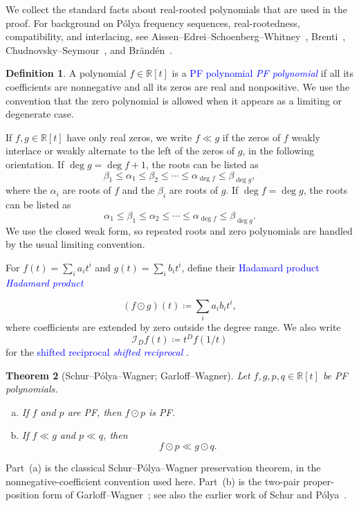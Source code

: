 \documentclass[reqno]{amsart}
\numberwithin{equation}{section}
\newtheorem{theorem}{Theorem}[section]
\theoremstyle{definition}
\newtheorem{definition}[theorem]{Definition}
\newcommand{\defin}[1]{%
\relax\ifmmode%
\textcolor{blue}{#1}%
\else\textcolor{blue}{\emph{#1}}%
\fi%
}
\newcommand{\setR}{\mathbb{R}}
\newcommand{\poly}{\setR[t]}
\newcommand{\had}{\odot}
\newcommand{\opI}{\mathcal{I}}
\begin{document}
We collect the standard facts about real-rooted polynomials that are used in
the proof.  For background on P{\'o}lya frequency sequences, real-rootedness,
compatibility, and interlacing, see
Aissen--Edrei--Schoenberg--Whitney~\cite{AissenEdreiSchoenbergWhitney1951},
Brenti~\cite{Brenti1989}, Chudnovsky--Seymour~\cite{ChudnovskySeymour2007},
and Br{\"a}nd{\'e}n~\cite{Branden2015}.

\begin{definition}
\label{def:pf}
A polynomial $f\in\poly$ is a \defin{PF polynomial} if all its coefficients
are nonnegative and all its zeros are real and nonpositive.  We use the
convention that the zero polynomial is allowed when it appears as a limiting
or degenerate case.
\end{definition}

If $f,g\in\poly$ have only real zeros, we write $f\ll g$ if the zeros of $f$
weakly interlace or weakly alternate to the left of the zeros of $g$, in the
following orientation.  If $\deg g=\deg f+1$, the roots can be listed as
\[
  \beta_1\leq \alpha_1\leq \beta_2\leq
  \dotsb\leq \alpha_{\deg f}\leq \beta_{\deg g},
\]
where the $\alpha_i$ are roots of $f$ and the $\beta_i$ are roots of $g$.  If
$\deg f=\deg g$, the roots can be listed as
\[
  \alpha_1\leq \beta_1\leq \alpha_2\leq
  \dotsb\leq \alpha_{\deg f}\leq \beta_{\deg g}.
\]
We use the closed weak form, so repeated roots and zero polynomials are
handled by the usual limiting convention.

For $f(t)=\sum_i a_it^i$ and $g(t)=\sum_i b_it^i$, define their
\defin{Hadamard product}
\[
  (f\had g)(t)\coloneqq \sum_i a_ib_i t^i ,
\]
where coefficients are extended by zero outside the degree range.  We also
write
\[
  \opI_Df(t)\coloneqq t^D f(1/t)
\]
for the \defin{shifted reciprocal}.

\begin{theorem}[Schur--P{\'o}lya--Wagner; Garloff--Wagner]
\label{thm:hadamardTools}
Let $f,g,p,q\in\poly$ be PF polynomials.
\begin{enumerate}[(a)]
\item If $f$ and $p$ are PF, then $f\had p$ is PF.
\item If $f\ll g$ and $p\ll q$, then
  \[
    f\had p\ll g\had q.
  \]
\end{enumerate}
\end{theorem}

Part~(a) is the classical Schur--P{\'o}lya--Wagner preservation theorem, in the
nonnegative-coefficient convention used here.  Part~(b) is the two-pair
proper-position form of Garloff--Wagner~\cite[Thm.~4]{GarloffWagner1996};
see also the earlier work of Schur and P{\'o}lya~\cite{SchurPolya1914}.
\end{document}
